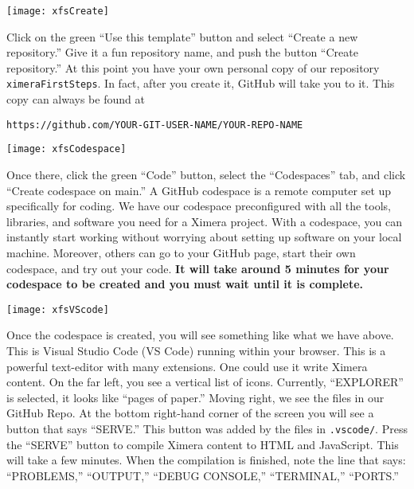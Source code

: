 \documentclass{ximera}
\begin{document}
\begin{image}
    \texttt{[image: xfsCreate]}
\end{image}
        Click on the green ``Use this template'' button and select ``Create a
        new repository.'' Give it a fun repository name, and push the button
        ``Create repository.''
        At this point you have your own personal copy of our repository
        \verb!ximeraFirstSteps!.
        In fact, after you create it, GitHub will take you to it. This copy can
        always
        be found at
        \begin{center}
            \verb!https://github.com/YOUR-GIT-USER-NAME/YOUR-REPO-NAME!
        \end{center}
        \newpage
        \pdfOnly{\end{multicols}}
\begin{image}
    \texttt{[image: xfsCodespace]}
\end{image}
        Once there, click the green ``Code'' button, select
        the ``Codespaces'' tab, and click ``Create codespace on main.''
        A GitHub codespace is a remote computer set up specifically for coding.
        We have our codespace preconfigured with all the tools, libraries, and
        software
        you need for a Ximera
        project. With a codespace, you can instantly start working
        without worrying about setting up software on your local machine.
        Moreover,
        others can go to your GitHub page, start their own codespace, and try
        out your
        code.
        \textbf{It will take around 5 minutes for your codespace to be created
            and you
            must wait until it is complete.}
        \pdfOnly{\end{multicols}}

\newpage

\begin{image}
    \texttt{[image: xfsVScode]}
\end{image}
        Once the codespace is created, you will see something like what we have
        above.
        This is Visual Studio Code (VS Code) running within your browser. This
        is a powerful text-editor with many extensions. One could use it write Ximera
        content.  On the far left, you see a
        vertical list of icons. Currently, ``EXPLORER'' is selected, it looks
        like
        ``pages of paper.'' Moving right, we see the files in our GitHub Repo.
        At the bottom right-hand corner of the screen you will see a button
        that says
        ``SERVE.'' This button was added by the files in \verb!.vscode/!.
        Press the ``SERVE'' button to compile Ximera content to HTML and
        JavaScript.
        This will take a few minutes. When the compilation is finished, note the line that says:
        ``PROBLEMS,'' ``OUTPUT,'' ``DEBUG CONSOLE,'' ``TERMINAL,'' ``PORTS.''
        \pdfOnly{\end{multicols}}
\end{document}
